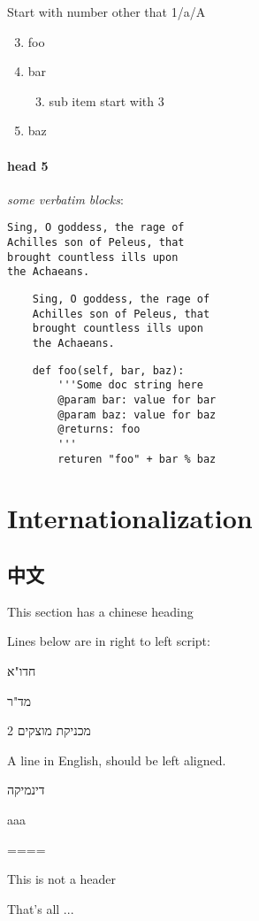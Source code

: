 Start with number other that 1/a/A



\begin{enumerate}[A]
\setcounter{enumi}{2}
\item foo
\item bar
\begin{enumerate}[1]
\setcounter{enumi}{2}
	\item sub item start with 3
\end{enumerate}\item baz
\end{enumerate}

\paragraph{head 5}

\emph{some verbatim blocks}:




\begin{lstlisting}
Sing, O goddess, the rage of
Achilles son of Peleus, that
brought countless ills upon
the Achaeans.

\end{lstlisting}



\begin{lstlisting}
    Sing, O goddess, the rage of
    Achilles son of Peleus, that
    brought countless ills upon
    the Achaeans.

\end{lstlisting}



\begin{lstlisting}
    def foo(self, bar, baz):
    	'''Some doc string here
    	@param bar: value for bar
    	@param baz: value for baz
    	@returns: foo
    	'''
    	returen "foo" + bar % baz

\end{lstlisting}


\section{Internationalization}



\subsection{中文}

This section has a chinese heading



Lines below are in right to left script:



חדו"א

מד"ר

מכניקת מוצקים 2

A line in English, should be left aligned.

דינמיקה



aaa



====

This is not a header



That's all ...

